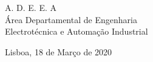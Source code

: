 \begin{titlepage}
		
    \vspace{1.5cm}
    \normalsize A. D. E. E. A\\
	Área Departamental de Engenharia \\
    Electrotécnica e Automação Industrial
	\vspace{2cm}
	

    \vspace{1.2cm}
	\centering %
	\begin{minipage}[b]{7cm}
			\centering
			Lisboa, 18 de Março de 2020\\
	\end{minipage}
	
	\restoregeometry
	
\end{titlepage}
\newpage
    \thispagestyle{empty}
    \mbox{}
